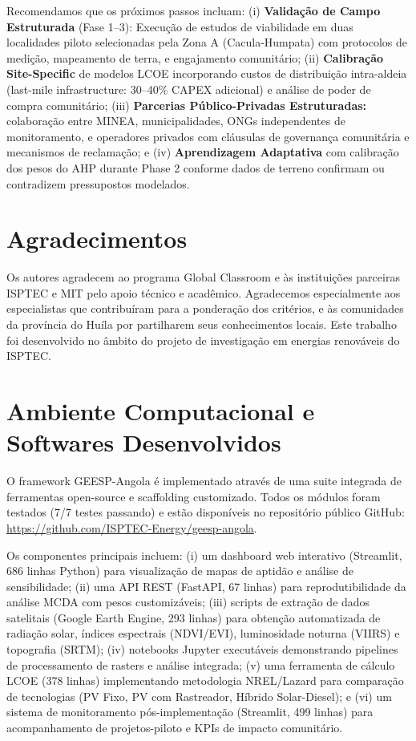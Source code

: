 \documentclass[12pt, a4paper]{article}
\begin{document}
\begin{itemize}
Recomendamos que os próximos passos incluam: (i) \textbf{Validação de Campo Estruturada} (Fase 1--3): Execução de estudos de viabilidade em duas localidades piloto selecionadas pela Zona A (Cacula-Humpata) com protocolos de medição, mapeamento de terra, e engajamento comunitário; (ii) \textbf{Calibração Site-Specific} de modelos LCOE incorporando custos de distribuição intra-aldeia (last-mile infrastructure: 30--40\% CAPEX adicional) e análise de poder de compra comunitário; (iii) \textbf{Parcerias Público-Privadas Estruturadas:} colaboração entre MINEA, municipalidades, ONGs independentes de monitoramento, e operadores privados com cláusulas de governança comunitária e mecanismos de reclamação; e (iv) \textbf{Aprendizagem Adaptativa} com calibração dos pesos do AHP durante Phase 2 conforme dados de terreno confirmam ou contradizem pressupostos modelados.

\section*{Agradecimentos}

Os autores agradecem ao programa Global Classroom e às instituições parceiras ISPTEC e MIT pelo apoio técnico e acadêmico. Agradecemos especialmente aos especialistas que contribuíram para a ponderação dos critérios, e às comunidades da província do Huíla por partilharem seus conhecimentos locais. Este trabalho foi desenvolvido no âmbito do projeto de investigação em energias renováveis do ISPTEC.




\appendix

\section{Ambiente Computacional e Softwares Desenvolvidos}

O framework GEESP-Angola é implementado através de uma suite integrada de ferramentas open-source e scaffolding customizado. Todos os módulos foram testados (7/7 testes passando) e estão disponíveis no repositório público GitHub: \url{https://github.com/ISPTEC-Energy/geesp-angola}.

Os componentes principais incluem: (i) um dashboard web interativo (Streamlit, 686 linhas Python) para visualização de mapas de aptidão e  análise de sensibilidade; (ii) uma API REST (FastAPI, 67 linhas) para reprodutibilidade da análise MCDA com pesos customizáveis; (iii) scripts de extração de dados satelitais (Google Earth Engine, 293 linhas) para obtenção automatizada de radiação solar, índices espectrais (NDVI/EVI), luminosidade noturna (VIIRS) e topografia (SRTM); (iv) notebooks Jupyter executáveis demonstrando pipelines de processamento de rasters e análise integrada; (v) uma ferramenta de cálculo LCOE (378 linhas) implementando metodologia NREL/Lazard para comparação de tecnologias (PV Fixo, PV com Rastreador, Híbrido Solar-Diesel); e (vi) um sistema de monitoramento pós-implementação (Streamlit, 499 linhas) para acompanhamento de projetos-piloto e KPIs de impacto comunitário.


\end{itemize}
\end{document}
